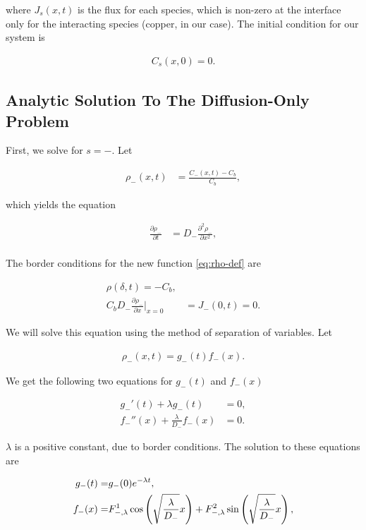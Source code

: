 where $J_s(x,t)$ is the flux for each species, which is non-zero at the interface only for the interacting species (copper, in our case). The initial condition for our system is

\begin{align}
	C_s(x, 0) = 0.
\label{eq:diffusion-bc}
\end{align}



\subsection{Analytic Solution To The Diffusion-Only Problem}

First, we solve for $s=-$. Let 

\begin{align}
	\rho_-(x,t) &= \frac{C_-(x,t) - C_b}{C_b},
	\label{eq:rho-def}
\end{align}

which yields the equation

\begin{align}
\frac{\partial \rho_-}{\partial t} &= D_- \frac{\partial^2 \rho_-}{\partial x^2},\\
\label{eq:diffusion-1d}
\end{align}


The border conditions for the new function \ref{eq:rho-def} are

\begin{align}
	\rho(\delta, t) = -C_b, \\
	C_b D_-\frac{\partial \rho_-}{\partial x}\big|_{x=0} &= J_-(0, t) = 0.
\end{align}


We will solve this equation using the method of separation of variables. Let

\begin{align}
	\rho_-(x,t) = g_-(t)f_-(x).
\end{align}

We get the following two equations for $g_-(t)$ and $f_-(x)$


\begin{align}
	g_-'(t) + \lambda g_-(t) &= 0,\\
	f_-''(x) + \frac{\lambda}{D_-} f_-(x) &= 0.
\end{align}

$\lambda$ is a positive constant, due to border conditions. The solution to these equations are

\begin{align}
	g_-(t) =& g_{-}(0)e^{-\lambda t},\\
	f_-(x) =& F^1_{-,\lambda}\cos\left({{\sqrt{\frac{\lambda}{D_-}} x}}\right) + F^2_{-,\lambda}\sin\left({\sqrt{\frac{\lambda}{D_-}} x}\right),
\end{align}

